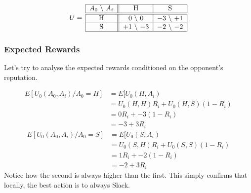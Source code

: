 \documentclass[10pt,fleqn]{article}
\begin{document}
\begin{figure}[h!]
  \centering
  \begin{equation*}
    U =\, 
      \begin{tabular}{|c||c|c|}
        \hline
        $A_0$ \textbackslash\ $A_i$ & H & S \\
        \hline\hline
        H & $0$ \textbackslash\ $0$ & $-3$ \textbackslash\ $+1$ \\
        \hline
        S & $+1$ \textbackslash\ $-3$ & $-2$ \textbackslash\ $-2$ \\
        \hline
      \end{tabular}
  \end{equation*}
\end{figure}

\subsubsection{Expected Rewards}

Let's try to analyse the expected rewards conditioned on the opponent's
reputation.

\begin{align*}
  E[U_0(A_0, A_i) / A_0 = H] &= E[U_0(H, A_i) \\
                             &= U_0(H, H) R_i + U_0(H, S) (1-R_i)\\
                             &= 0 R_i + -3 (1-R_i) \\
                             &= -3 + 3 R_i
\end{align*}
\begin{align*}
  E[U_0(A_0, A_i) / A_0 = S] &= E[U_0(S, A_i) \\
                             &= U_0(S, H) R_i + U_0(S, S) (1-R_i) \\
                             &= 1 R_i + -2 (1-R_i) \\
                             &= -2 + 3 R_i
\end{align*}
Notice how the second is always higher than the first. This simply confirms that
locally, the best action is to always Slack.
\end{document}
